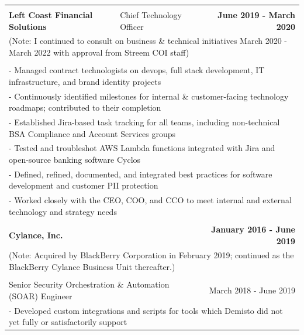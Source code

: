 \documentclass[letterpaper]{article}
\begin{document}
\begin{center}
\begin{tabular}{p{}p{}r}
			\\
			\\
				\textbf{Left Coast Financial Solutions} &
				\quad\quad\quad\quad\quad Chief Technology Officer &
				\textbf{June 2019 - March 2020\quad}
			\\
				\multicolumn{3}{p{\textwidth}}{(Note: I continued to consult on business \& technical initiatives March 2020 - March 2022 with approval from Streem COI staff)}
			\\
			\\
				\multicolumn{3}{p{\textwidth}}{\quad\quad - Managed contract technologists on devops, full stack development, IT infrastructure, and brand identity projects} 
			\\
				\multicolumn{3}{p{\textwidth}}{\quad\quad - Continuously identified milestones for internal \& customer-facing technology roadmaps; contributed to their completion}  
			\\
				\multicolumn{3}{p{\textwidth}}{\quad\quad - Established Jira-based task tracking for all teams, including non-technical BSA Compliance and Account Services groups}
			\\
				\multicolumn{3}{p{\textwidth}}{\quad\quad - Tested and troubleshot AWS Lambda functions integrated with Jira and open-source banking software Cyclos} 
			\\
				\multicolumn{3}{p{\textwidth}}{\quad\quad - Defined, refined, documented, and integrated best practices for software development and customer PII protection}
			\\
				\multicolumn{3}{p{\textwidth}}{\quad\quad - Worked closely with the CEO, COO, and CCO to meet internal and external technology and strategy needs}
			\\
			\\
				\textbf{Cylance, Inc.} & &
				\textbf{January 2016 - June 2019\quad}
			\\		%
				\multicolumn{3}{p{\textwidth}}{(Note: Acquired by BlackBerry Corporation in February 2019; continued as the BlackBerry Cylance Business Unit thereafter.)}
			\\
			\\
				\multicolumn{2}{p{0.5\textwidth}}{\quad Senior Security Orchestration \& Automation (SOAR) Engineer}
				&
				{March 2018 - June 2019 \quad\quad\quad\quad}
			\\
				\multicolumn{3}{p{\textwidth}}{\quad\quad - Developed custom integrations and scripts for tools which Demisto did not yet fully or satisfactorily support}

\end{tabular}
\end{center}
\end{document}
